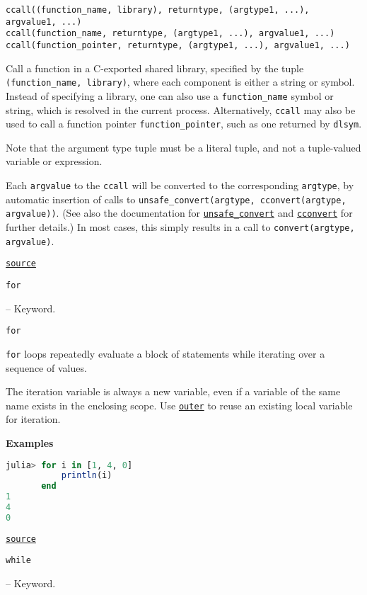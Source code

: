 \begin{adjustwidth}{2em}{0pt}


\begin{lstlisting}[]
ccall((function_name, library), returntype, (argtype1, ...), argvalue1, ...)
ccall(function_name, returntype, (argtype1, ...), argvalue1, ...)
ccall(function_pointer, returntype, (argtype1, ...), argvalue1, ...)
\end{lstlisting}

Call a function in a C-exported shared library, specified by the tuple \texttt{(function\_name, library)}, where each component is either a string or symbol. Instead of specifying a library, one can also use a \texttt{function\_name} symbol or string, which is resolved in the current process. Alternatively, \texttt{ccall} may also be used to call a function pointer \texttt{function\_pointer}, such as one returned by \texttt{dlsym}.

Note that the argument type tuple must be a literal tuple, and not a tuple-valued variable or expression.

Each \texttt{argvalue} to the \texttt{ccall} will be converted to the corresponding \texttt{argtype}, by automatic insertion of calls to \texttt{unsafe\_convert(argtype, cconvert(argtype, argvalue))}. (See also the documentation for \href{@ref Base.unsafe\_convert}{\texttt{unsafe\_convert}} and \href{@ref Base.cconvert}{\texttt{cconvert}} for further details.) In most cases, this simply results in a call to \texttt{convert(argtype, argvalue)}.



\href{https://github.com/JuliaLang/julia/blob/8e630552924eac54c809aa7bc30871c7df1582d3/base/docs/basedocs.jl#L1219-L1237}{\texttt{source}}


\end{adjustwidth}
\hypertarget{9105224580875818383}{\texttt{for}}  -- {Keyword.}

\begin{adjustwidth}{2em}{0pt}


\begin{lstlisting}[]
for
\end{lstlisting}

\texttt{for} loops repeatedly evaluate a block of statements while iterating over a sequence of values.

The iteration variable is always a new variable, even if a variable of the same name exists in the enclosing scope. Use \href{@ref}{\texttt{outer}} to reuse an existing local variable for iteration.

\textbf{Examples}


\begin{lstlisting}[language=julia, style=jlcodestyle]
julia> for i in [1, 4, 0]
           println(i)
       end
1
4
0
\end{lstlisting}



\href{https://github.com/JuliaLang/julia/blob/8e630552924eac54c809aa7bc30871c7df1582d3/base/docs/basedocs.jl#L906-L925}{\texttt{source}}


\end{adjustwidth}
\hypertarget{15133348314455964692}{\texttt{while}}  -- {Keyword.}

